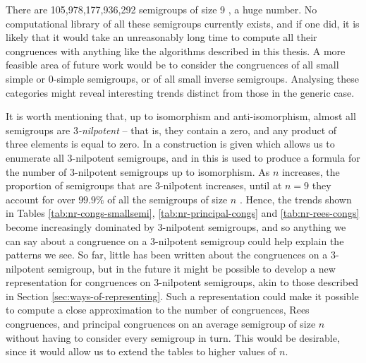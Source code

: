 There are 105,978,177,936,292 semigroups of size 9 , a huge
number.  No computational library of all these semigroups currently exists, and
if one did, it is likely that it would take an unreasonably long time to compute
all their congruences with anything like the algorithms described in this
thesis.  A more feasible area of future work would be to consider the
congruences of all small simple or 0-simple semigroups, or of all small inverse
semigroups.  Analysing these categories might reveal interesting trends distinct
from those in the generic case.

It is worth mentioning that, up to isomorphism and anti-isomorphism, almost all
semigroups are \textit{$3$-nilpotent} -- that is, they contain a zero, and any
product of three elements is equal to zero.  In \cite{kleitman_1976} a
construction is given which allows us to enumerate all $3$-nilpotent semigroups,
and in \cite[Theorem 2.3.5]{distler_thesis} this is used to produce a formula for the
number of $3$-nilpotent semigroups up to isomorphism.  As
$n$ increases, the proportion of semigroups that are $3$-nilpotent increases,
until at $n=9$ they account for over $99.9\%$ of all the semigroups of size $n$
\cite[Table 2.1]{distler_thesis}.
Hence, the trends shown in Tables \ref{tab:nr-congs-smallsemi},
\ref{tab:nr-principal-congs} and \ref{tab:nr-rees-congs} become increasingly
dominated by $3$-nilpotent semigroups, and so anything we can say about a
congruence on a $3$-nilpotent semigroup could help explain the patterns we see.
So far, little has been written about the congruences on a $3$-nilpotent
semigroup, but in the future it might be possible to develop a new
representation for congruences on $3$-nilpotent semigroups, akin to those
described in Section \ref{sec:ways-of-representing}.  Such a representation
could make it possible to compute a close approximation to the number of
congruences, Rees congruences, and principal congruences on an average semigroup
of size $n$ without having to consider every semigroup in turn.  This would be
desirable, since it would allow us to extend the tables to higher values of $n$.
